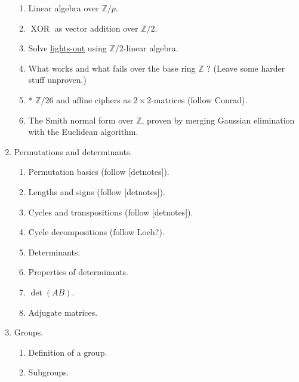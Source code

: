 \documentclass[numbers=enddot,12pt,final,onecolumn,notitlepage]{scrartcl}%
\theoremstyle{definition}
\begin{document}
\begin{enumerate}
\begin{enumerate}
\item Linear algebra over $\mathbb{Z}/p$.

\item $\operatorname*{XOR}$ as vector addition over $\mathbb{Z}/2$.

\item Solve \href{https://en.wikipedia.org/wiki/Lights_Out_(game)}{lights-out}
using $\mathbb{Z}/2$-linear algebra.

\item What works and what fails over the base ring $\mathbb{Z}$ ? (Leave some
harder stuff unproven.)

\item * $\mathbb{Z}/26$ and affine ciphers as $2\times2$-matrices (follow Conrad).

\item The Smith normal form over $\mathbb{Z}$, proven by merging Gaussian
elimination with the Euclidean algorithm.
\end{enumerate}

\item Permutations and determinants.

\begin{enumerate}
\item Permutation basics (follow [detnotes]).

\item Lengths and signs (follow [detnotes]).

\item Cycles and transpositions (follow [detnotes]).

\item Cycle decompositions (follow Loeh?).

\item Determinants.

\item Properties of determinants.

\item $\det\left(  AB\right)  $.

\item Adjugate matrices.
\end{enumerate}

\item Groups.

\begin{enumerate}
\item Definition of a group.

\item Subgroups.


\end{enumerate}
\end{enumerate}
\end{document}
